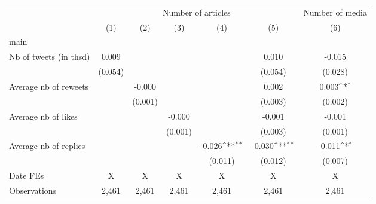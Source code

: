 {
\def\sym#1{\ifmmode^{#1}\else\(^{#1}\)\fi}
\begin{tabular}{l*{6}{c}}
\hline\hline
                    &\multicolumn{5}{c}{Number of articles}                                                                       &\multicolumn{1}{c}{Number of media}\\\cmidrule(lr){2-6}\cmidrule(lr){7-7}
                    &\multicolumn{1}{c}{(1)}         &\multicolumn{1}{c}{(2)}         &\multicolumn{1}{c}{(3)}         &\multicolumn{1}{c}{(4)}         &\multicolumn{1}{c}{(5)}         &\multicolumn{1}{c}{(6)}         \\
\hline
main                &                     &                     &                     &                     &                     &                     \\
Nb of tweets (in thsd)&       0.009         &                     &                     &                     &       0.010         &      -0.015         \\
                    &     (0.054)         &                     &                     &                     &     (0.054)         &     (0.028)         \\
Average nb of reweets&                     &      -0.000         &                     &                     &       0.002         &       0.003\sym{*}  \\
                    &                     &     (0.001)         &                     &                     &     (0.003)         &     (0.002)         \\
Average nb of likes &                     &                     &      -0.000         &                     &      -0.001         &      -0.001         \\
                    &                     &                     &     (0.001)         &                     &     (0.003)         &     (0.001)         \\
Average nb of replies&                     &                     &                     &      -0.026\sym{**} &      -0.030\sym{**} &      -0.011\sym{*}  \\
                    &                     &                     &                     &     (0.011)         &     (0.012)         &     (0.007)         \\
\hline
Date FEs            &           X         &           X         &           X         &           X         &           X         &           X         \\
Observations        &       2,461         &       2,461         &       2,461         &       2,461         &       2,461         &       2,461         \\

\end{tabular}}

